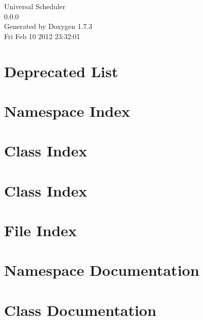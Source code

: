 \documentclass[a4paper]{book}
\begin{document}
\hypersetup{pageanchor=false}
\begin{titlepage}
\vspace*{7cm}
\begin{center}
{\Large Universal Scheduler \\[1ex]\large 0.0.0 }\\
\vspace*{1cm}
{\large Generated by Doxygen 1.7.3}\\
\vspace*{0.5cm}
{\small Fri Feb 10 2012 23:32:01}\\
\end{center}
\end{titlepage}
\clearemptydoublepage
{}
\tableofcontents
\clearemptydoublepage
{}
\hypersetup{pageanchor=true}
\chapter{Deprecated List}
\label{deprecated}
\hypertarget{deprecated}{}

\chapter{Namespace Index}

\chapter{Class Index}

\chapter{Class Index}

\chapter{File Index}

\chapter{Namespace Documentation}



\chapter{Class Documentation}












\end{document}
